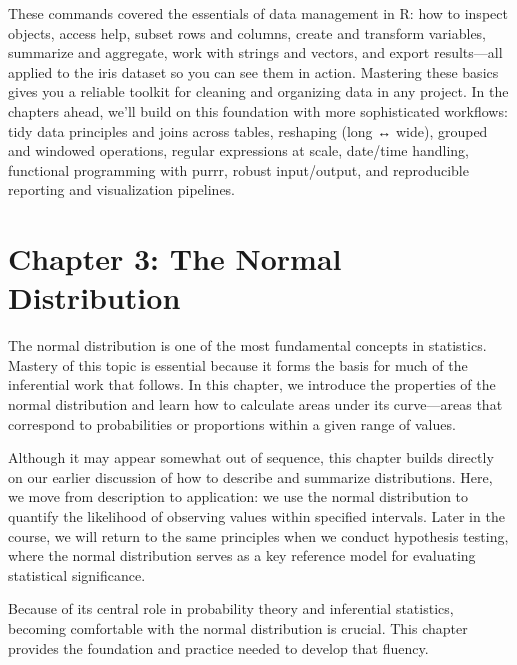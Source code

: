 \documentclass[
  letterpaper,
  DIV=11,
  numbers=noendperiod]{scrreprt}
\begin{document}
These commands covered the essentials of data management in R: how to
inspect objects, access help, subset rows and columns, create and
transform variables, summarize and aggregate, work with strings and
vectors, and export results---all applied to the iris dataset so you can
see them in action. Mastering these basics gives you a reliable toolkit
for cleaning and organizing data in any project. In the chapters ahead,
we'll build on this foundation with more sophisticated workflows: tidy
data principles and joins across tables, reshaping (long ↔ wide),
grouped and windowed operations, regular expressions at scale, date/time
handling, functional programming with purrr, robust input/output, and
reproducible reporting and visualization pipelines.


\chapter{Chapter 3: The Normal
Distribution}\label{chapter-3-the-normal-distribution}

The normal distribution is one of the most fundamental concepts in
statistics. Mastery of this topic is essential because it forms the
basis for much of the inferential work that follows. In this chapter, we
introduce the properties of the normal distribution and learn how to
calculate areas under its curve---areas that correspond to probabilities
or proportions within a given range of values.

Although it may appear somewhat out of sequence, this chapter builds
directly on our earlier discussion of how to describe and summarize
distributions. Here, we move from description to application: we use the
normal distribution to quantify the likelihood of observing values
within specified intervals. Later in the course, we will return to the
same principles when we conduct hypothesis testing, where the normal
distribution serves as a key reference model for evaluating statistical
significance.

Because of its central role in probability theory and inferential
statistics, becoming comfortable with the normal distribution is
crucial. This chapter provides the foundation and practice needed to
develop that fluency.
\end{document}
